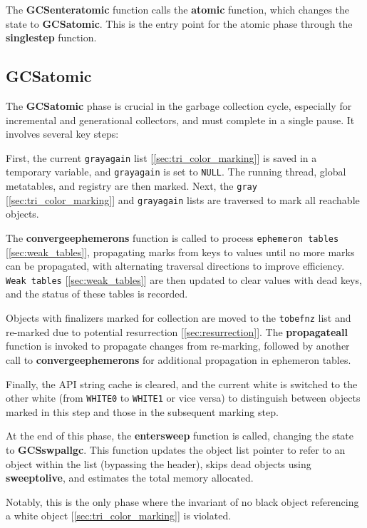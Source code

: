 \documentclass[10pt]{article}
\begin{document}
The \textbf{GCSenteratomic} function calls the \textbf{atomic} function, which changes the state to \textbf{GCSatomic}. This is the entry point for the atomic phase through the \textbf{singlestep} function.


\subsection{GCSatomic} \label{sec:gcsatomic}

The \textbf{GCSatomic} phase is crucial in the garbage collection cycle, especially for incremental and generational collectors, and must complete in a single pause. It involves several key steps:

First, the current \texttt{grayagain} list [\ref{sec:tri_color_marking}] is saved in a temporary variable, and \texttt{grayagain} is set to \texttt{NULL}. The running thread, global metatables, and registry are then marked. Next, the \texttt{gray} [\ref{sec:tri_color_marking}] and \texttt{grayagain} lists are traversed to mark all reachable objects.

The \textbf{convergeephemerons} function is called to process \texttt{ephemeron tables} [\ref{sec:weak_tables}], propagating marks from keys to values until no more marks can be propagated, with alternating traversal directions to improve efficiency. \texttt{Weak tables} [\ref{sec:weak_tables}] are then updated to clear values with dead keys, and the status of these tables is recorded.

Objects with finalizers marked for collection are moved to the \texttt{tobefnz} list and re-marked due to potential resurrection [\ref{sec:resurrection}]. The \textbf{propagateall} function is invoked to propagate changes from re-marking, followed by another call to \textbf{convergeephemerons} for additional propagation in ephemeron tables.

Finally, the API string cache is cleared, and the current white is switched to the other white (from \texttt{WHITE0} to \texttt{WHITE1} or vice versa) to distinguish between objects marked in this step and those in the subsequent marking step.

At the end of this phase, the \textbf{entersweep} function is called, changing the state to \textbf{GCSswpallgc}. This function updates the object list pointer to refer to an object within the list (bypassing the header), skips dead objects using \textbf{sweeptolive}, and estimates the total memory allocated.

Notably, this is the only phase where the invariant of no black object referencing a white object [\ref{sec:tri_color_marking}] is violated.
\end{document}
